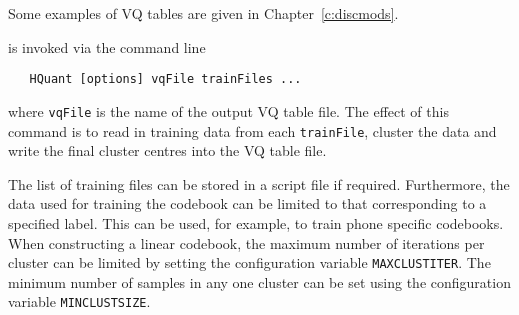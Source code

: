 Some examples of VQ tables are given in Chapter~\ref{c:discmods}.


 is invoked via the command line

\begin{verbatim}
   HQuant [options] vqFile trainFiles ...
\end{verbatim}
where \texttt{vqFile} is the name of the output VQ table file.
The effect of this command
is to read in training data from each \texttt{trainFile}, cluster the
data and write the final cluster centres into the VQ table file.

The list of training files can be stored in a script file if required.
Furthermore, the data used for training the codebook
can be limited to that corresponding to a specified label.  This can be
used, for example, to train phone specific codebooks.  When constructing
a linear codebook, the maximum number of iterations per cluster can be
limited by setting the configuration variable \texttt{MAXCLUSTITER}.
The minimum number of samples in any one cluster can be set using the
 configuration variable \texttt{MINCLUSTSIZE}.

